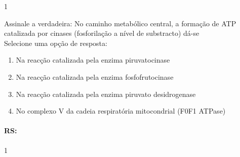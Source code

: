 \documentclass[\mainfilename]{subfiles}
\begin{document}
\begin{questionBox}1{} %
    
    Assinale a verdadeira: No caminho metabólico central, a formação de ATP catalizada por cinases (fosforilação a nível de substracto) dá-se\\

    Selecione uma opção de resposta:
    \begin{enumerate}
        \item Na reacção catalizada pela enzima piruvatocinase 
        \item Na reacção catalizada pela enzima fosfofrutocinase
        \item Na reacção catalizada pela enzima piruvato desidrogenase
        \item No complexo V da cadeia respiratória mitocondrial (F0F1 ATPase)
    \end{enumerate}

    \paragraph{RS:} 1
    
\end{questionBox}
\end{document}
